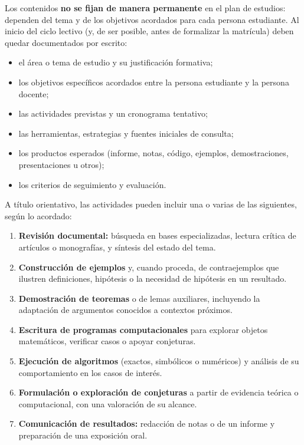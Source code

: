 \begin{refsection}
Los contenidos \textbf{no se fijan de manera permanente} en el plan de estudios: dependen del tema y de los objetivos acordados para cada persona estudiante. Al inicio del ciclo lectivo (y, de ser posible, antes de formalizar la matrícula) deben quedar documentados por escrito:

\begin{itemize}
\item el área o tema de estudio y su justificación formativa;
\item los objetivos específicos acordados entre la persona estudiante y la persona docente;
\item las actividades previstas y un cronograma tentativo;
\item las herramientas, estrategias y fuentes iniciales de consulta;
\item los productos esperados (informe, notas, código, ejemplos, demostraciones, presentaciones u otros);
\item los criterios de seguimiento y evaluación.
\end{itemize}

A título orientativo, las actividades pueden incluir una o varias de las siguientes, según lo acordado:

\begin{enumerate}
\item \textbf{Revisión documental:} búsqueda en bases especializadas, lectura crítica de artículos o monografías, y síntesis del estado del tema.
\item \textbf{Construcción de ejemplos} y, cuando proceda, de contraejemplos que ilustren definiciones, hipótesis o la necesidad de hipótesis en un resultado.
\item \textbf{Demostración de teoremas} o de lemas auxiliares, incluyendo la adaptación de argumentos conocidos a contextos próximos.
\item \textbf{Escritura de programas computacionales} para explorar objetos matemáticos, verificar casos o apoyar conjeturas.
\item \textbf{Ejecución de algoritmos} (exactos, simbólicos o numéricos) y análisis de su comportamiento en los casos de interés.
\item \textbf{Formulación o exploración de conjeturas} a partir de evidencia teórica o computacional, con una valoración de su alcance.
\item \textbf{Comunicación de resultados:} redacción de notas o de un informe y preparación de una exposición oral.
\end{enumerate}


\end{refsection}

